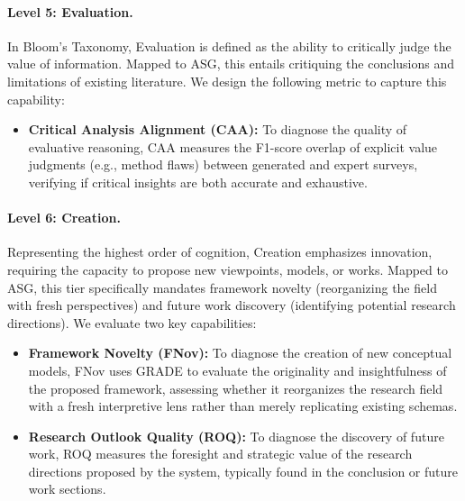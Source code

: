 \documentclass[11pt]{article}
\begin{document}
\paragraph{Level 5: Evaluation.}
\label{sec:l5_evaluation}
In Bloom's Taxonomy, Evaluation is defined as the ability to critically judge the value of information. Mapped to ASG, this entails critiquing the conclusions and limitations of existing literature. We design the following metric to capture this capability:
\begin{itemize}[leftmargin=0.2cm, itemsep=0pt, parsep=0pt] 
\item \textbf{Critical Analysis Alignment (CAA):}
To diagnose the quality of evaluative reasoning, CAA measures the F1-score overlap of explicit value judgments (e.g., method flaws) between generated and expert surveys, verifying if critical insights are both accurate and exhaustive.
\end{itemize}

\paragraph{Level 6: Creation.}
\label{sec:l6_creation}
Representing the highest order of cognition, Creation emphasizes innovation, requiring the capacity to propose new viewpoints, models, or works. Mapped to ASG, this tier specifically mandates framework novelty (reorganizing the field with fresh perspectives) and future work discovery (identifying potential research directions). We evaluate two key capabilities:

\begin{itemize}[leftmargin=0.2cm, itemsep=0pt, parsep=0pt] 
\item \textbf{Framework Novelty (FNov):} To diagnose the creation of new conceptual models, FNov uses GRADE to evaluate the originality and insightfulness of the proposed framework, assessing whether it reorganizes the research field with a fresh interpretive lens rather than merely replicating existing schemas.
\item \textbf{Research Outlook Quality (ROQ):} To diagnose the discovery of future work, ROQ measures the foresight and strategic value of the research directions proposed by the system, typically found in the conclusion or future work sections.
\end{itemize}


\end{document}
